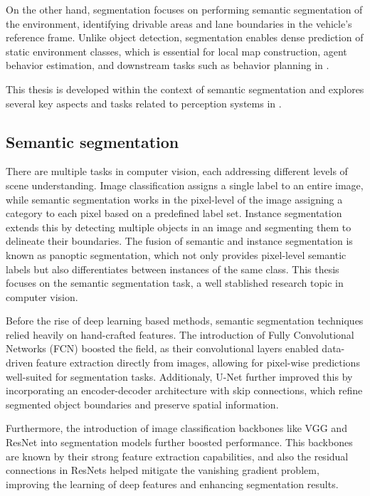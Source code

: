 {On the other hand,  segmentation focuses on performing semantic segmentation of the environment, identifying drivable areas and lane boundaries in the vehicle's reference frame. Unlike object detection,  segmentation enables dense prediction of static environment classes, which is essential for local map construction, agent behavior estimation, and downstream tasks such as behavior planning in  \cite{BEV_perception_survey}.

This thesis is developed within the context of  semantic segmentation and explores several key aspects and tasks related to perception systems in .

\subsection{Semantic segmentation} 
\label{sec:sota_semantic_segmentation}

There are multiple tasks in computer vision, each addressing different levels of scene understanding. Image classification assigns a single label to an entire image, while semantic segmentation works in the pixel-level of the image assigning a category to each pixel based on a predefined label set. Instance segmentation extends this by detecting multiple objects in an image and segmenting them to delineate their boundaries. The fusion of semantic and instance segmentation is known as panoptic segmentation, which not only provides pixel-level semantic labels but also differentiates between instances of the same class. This thesis focuses on the semantic segmentation task, a well stablished research topic in computer vision.

Before the rise of deep learning based methods, semantic segmentation techniques relied heavily on hand-crafted features. The introduction of Fully Convolutional Networks (FCN) \cite{FCNs} boosted the field, as their convolutional layers enabled data-driven feature extraction directly from images, allowing for pixel-wise predictions well-suited for segmentation tasks. Additionaly, U-Net \cite{u_net} further improved this by incorporating an encoder-decoder architecture with skip connections, which refine segmented object boundaries and preserve spatial information.

Furthermore, the introduction of image classification backbones like VGG \cite{VGG} and ResNet \cite{ResNet} into segmentation models further boosted performance. This backbones are known by their strong feature extraction capabilities, and also the residual connections in ResNets helped mitigate the vanishing gradient problem, improving the learning of deep features and enhancing segmentation results.

}
